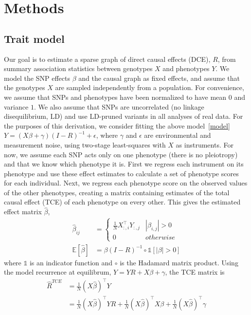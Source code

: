\documentclass{article}
\begin{document}
\section{Methods}\label{methods}
\subsection{Trait model}
Our goal is to estimate a sparse graph of direct causal effects (DCE), $R$, from
summary association statistics between genotypes $X$ and phenotypes $Y$. We model
the SNP effects $\beta$ and the causal graph as fixed effects, and assume that the genotypes
$X$ are sampled independently from a population. For convenience, we assume that SNPs
 and phenotypes have been normalized
 to have mean $0$ and variance $1$. We also assume that SNPs are uncorrelated (no linkage disequilibrium, LD)
and use LD-pruned variants in all analyses of real data.
For the purposes of this derivation,
we consider fitting the above model~\eqref{model} $Y = (X\beta + \gamma)(I-R)^{-1} + \epsilon$,
where $\gamma$ and $\epsilon$ are environmental and measurement noise,
using two-stage least-squares with $X$ as instruments.
For now, we assume each SNP acts only on one phenotype
(there is no pleiotropy) and that we know which phenotype it is.
First we regress each instrument on its phenotype and use these effect
 estimates to calculate a set of phenotype scores for each individual.
Next, we regress each phenotype score on the observed values of the other phenotypes,
 creating a matrix containing estimates of the total causal effect (TCE) of
 each phenotype on every other. This gives the estimated effect matrix $\hat{\beta}$,
\begin{align*}
\hat{\beta}_{ij} &= \left\{
 \begin{array}{ll}
  \frac{1}{N} X_{:, i}^{\top}Y_{:,j} & |\beta_{i,j}| > 0 \\
  0 & otherwise
 \end{array} \right. \\
 \mathbb{E}[\hat{\beta} ] &= \beta (I-R)^{-1} \circ \mathds{1}[|\beta| > 0]
\end{align*}
where $\mathds{1}$ is an indicator function and $\circ$ is the Hadamard matrix
product. Using the model recurrence at equilibrum, $Y = Y R + X \beta + \gamma$, the TCE matrix is
\begin{align*}
\hat{R}^{TCE} &= \frac{1}{N} (X\hat{\beta})^{\top} Y \\
  &= \frac{1}{N} (X\hat{\beta})^{\top} Y R + \frac{1}{N}(X\hat{\beta})^{\top} X \beta +
     \frac{1}{N}(X\hat{\beta})^{\top} \gamma
  \end{align*}
\end{document}
